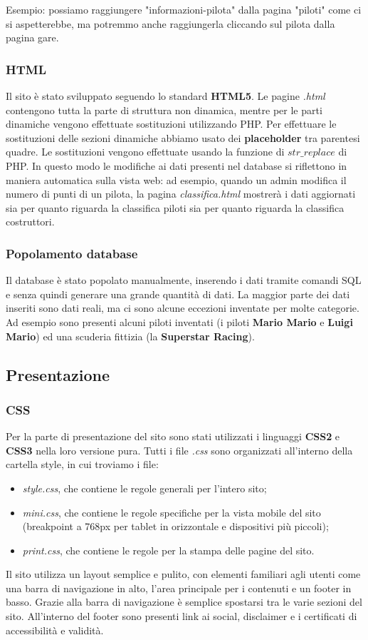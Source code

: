 \documentclass[11pt,a4paper]{article}
\begin{document}
Esempio: possiamo raggiungere "informazioni-pilota" dalla pagina "piloti" come ci si aspetterebbe, ma potremmo anche raggiungerla cliccando sul pilota dalla pagina gare.
\subsubsection{HTML}
Il sito è stato sviluppato seguendo lo standard  \textbf{HTML5}. Le pagine \textit{.html} contengono tutta la parte di struttura non dinamica, mentre per le parti dinamiche vengono effettuate sostituzioni utilizzando PHP. Per effettuare le sostituzioni delle sezioni dinamiche abbiamo usato dei \textbf{placeholder} tra parentesi quadre. Le sostituzioni vengono effettuate usando la funzione di $str\_replace$ di PHP. In questo modo le modifiche ai dati presenti nel database si riflettono in maniera automatica sulla vista web: ad esempio, quando un admin modifica il numero di punti di un pilota, la pagina \textit{classifica.html} mostrerà i dati aggiornati sia per quanto riguarda la classifica piloti sia per quanto riguarda la classifica costruttori.
\subsubsection{Popolamento database}
Il database è stato popolato manualmente, inserendo i dati tramite comandi SQL e senza quindi generare una grande quantità di dati. La maggior parte dei dati inseriti sono dati reali, ma ci sono alcune eccezioni inventate per molte categorie.
Ad esempio sono presenti alcuni piloti inventati (i piloti \textbf{Mario Mario} e \textbf{Luigi Mario}) ed una scuderia fittizia (la \textbf{Superstar Racing}).
\subsection{Presentazione}
\subsubsection{CSS}
Per la parte di presentazione del sito sono stati utilizzati i linguaggi \textbf{CSS2} e \textbf{CSS3} nella loro versione pura. Tutti i file \textit{.css} sono organizzati all'interno della cartella style, in cui troviamo i file:
\begin{itemize}
    \item \textit{style.css}, che contiene le regole generali per l'intero sito;
    \item \textit{mini.css}, che contiene le regole specifiche per la vista mobile del sito (breakpoint a 768px per tablet in orizzontale e dispositivi più piccoli);
    \item \textit{print.css}, che contiene le regole per la stampa delle pagine del sito.
\end{itemize}
Il sito utilizza un layout semplice e pulito, con elementi familiari agli utenti come una barra di navigazione in alto, l'area principale per i contenuti e un footer in basso.
Grazie alla barra di navigazione è semplice spostarsi tra le varie sezioni del sito.
All'interno del footer sono presenti link ai social, disclaimer e i certificati di accessibilità e validità.
\end{document}
